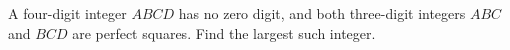 A four-digit integer $ ABCD $ has no zero digit, and both three-digit integers $ ABC $ and $ BCD $ are perfect squares. Find the largest such integer.
